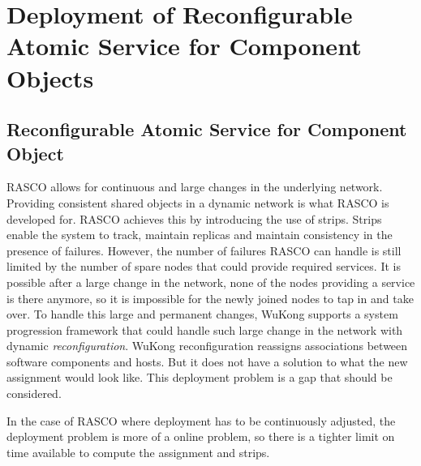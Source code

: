 \cleardoublepage
\singlespacing
\chapter{Deployment of Reconfigurable Atomic Service for Component Objects}
\label{c:deploy}
\doublespacing\nointerlineskip

\begin{comment}
Niels:about the tradeoffs in determining the deployment from your fault
tolerance perspective
\end{comment}

\section{Reconfigurable Atomic Service for Component Object}

\begin{comment}
Niels suggested that I show that I am aware of such issue with determining
optimality for deployment which is not clear for WuKong yet, there are many
ways or metrics to optimize for, all I can do in this work is to identify some
tradeoffs certain deployment for fault tolerance could influence the system
with certain metrics.

Limits will be hard to define here
\end{comment}

RASCO allows for continuous and large changes in the underlying
network. Providing consistent shared objects in a dynamic network is what RASCO
is developed for. RASCO achieves this by introducing the use of strips. Strips
enable the system to track, maintain replicas and maintain consistency in the
presence of failures. However, the number of failures RASCO can handle is still
limited by the number of spare nodes that could provide required services. It is
possible after a large change in the network, none of the nodes providing
a service is there anymore, so it is impossible for the newly joined
nodes to tap in and take over. To handle this large and permanent changes,
WuKong supports a system progression framework that could handle such large
change in the network with dynamic \emph{reconfiguration}. WuKong
reconfiguration reassigns associations between software components and hosts.
But it does not have a solution to what the new assignment would look like.
This deployment problem is a gap that should be considered.

In the case of RASCO where deployment has to be continuously adjusted, the
deployment problem is more of a online problem, so there is a tighter limit on
time available to compute the assignment and strips.

